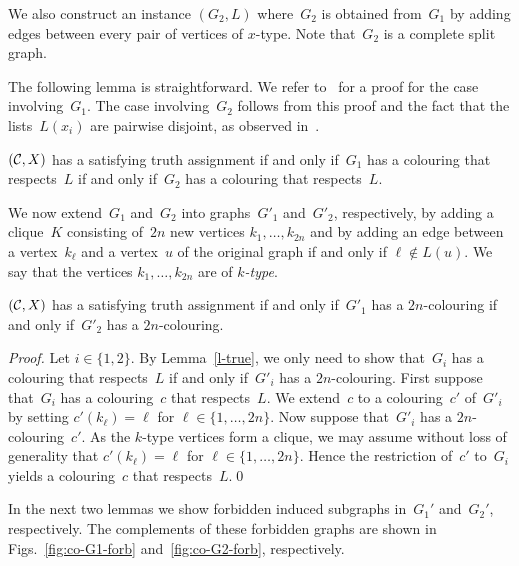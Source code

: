 \documentclass{llncs}
\newcommand\figurenames{Figs.}
\begin{document}
We also construct an instance $(G_2,L)$ where~$G_2$ is obtained from~$G_1$ by adding edges between every pair of vertices of $x$-type.
Note that~$G_2$ is a complete split graph.

The following lemma is straightforward.
We refer to~\cite{GH09} for a proof for the case involving~$G_1$.
The case involving~$G_2$ follows from this proof and the fact that the lists~$L(x_i)$ are pairwise disjoint, as observed in~\cite{GP14}.

\begin{lemma}[\cite{GH09}]\label{l-true}
$({\cal C},X)$ has a satisfying truth assignment if and only if~$G_1$ has a colouring that respects~$L$ if and only if~$G_2$ has a colouring that respects~$L$.
\end{lemma}

We now extend~$G_1$ and~$G_2$ into graphs~$G'_1$ and~$G'_2$, respectively, by adding a clique~$K$ consisting of~$2n$ new vertices $k_1,\ldots,k_{2n}$ and by adding an edge between a vertex~$k_\ell$ and a vertex~$u$ of the original graph if and only if $\ell\notin L(u)$.
We say that the vertices $k_1,\ldots,k_{2n}$ are of {\em $k$-type}.

\begin{lemma}\label{l-truth}
$({\cal C},X)$ has a satisfying truth assignment if and only if~$G'_1$ has a $2n$-colouring if and only if~$G'_2$ has a $2n$-colouring.
\end{lemma}

\begin{proof}
Let $i\in \{1,2\}$.
By Lemma~\ref{l-true}, we only need to show that~$G_i$ has a colouring that respects~$L$ if and only if~$G'_i$ has a $2n$-colouring.
First suppose that~$G_i$ has a colouring~$c$ that respects~$L$.
We extend~$c$ to a colouring~$c'$ of~$G'_i$ by setting $c'(k_\ell)=\ell$ for $\ell \in\{1,\ldots,2n\}$.
Now suppose that~$G'_i$ has a $2n$-colouring~$c'$.
As the $k$-type vertices form a clique, we may assume without loss of generality that $c'(k_\ell)=\ell$ for $\ell \in \{1,\ldots,2n\}$.
Hence the restriction of~$c'$ to~$G_i$ yields a colouring~$c$ that respects~$L$.\qed
\end{proof}

In the next two lemmas we show forbidden induced subgraphs in~$G_1'$ and~$G_2'$, respectively.
The complements of these forbidden graphs are shown in \figurenames~\ref{fig:co-G1-forb} and~\ref{fig:co-G2-forb}, respectively.
\end{document}
